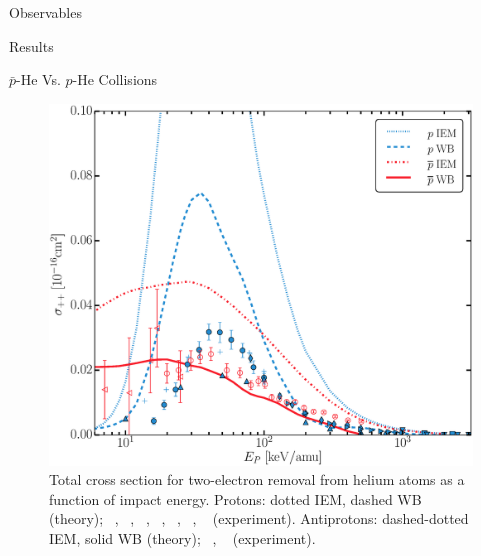 \documentclass[letterpaper, 11 pt]{report}
\begin{document}
\begin{chapter}{Observables \label{chap:p-he2p-he}}
\begin{section}{Results \label{sec:phe2p-res}}
\begin{subsection}{ \texorpdfstring{$\bar{p}$}{pbar}-He Vs. \texorpdfstring{$p$}{p}-He Collisions
                         \label{sec:pbarhe-res}}
\begin{figure}[ht]
\begin{minipage}{.49\linewidth}
               \centering
               \includegraphics[width = \linewidth]{./images/pbarhe/pbarhe-++.eps}
               \caption[Total cross section for two-electron removal from helium atoms as a function of
                        impact energy]
                       {Total cross section for two-electron removal from helium atoms as a function
                        of impact energy. Protons: dotted IEM, dashed WB (theory);
                        {\color{blue}{$\blacktriangle$}}~\cite{DTR84}, {\color{blue}{$+$}}~\cite{Sol62},
                        {\color{blue}{$\bullet$}}~\cite{SG89},
                        {\color{blue}{$\blacklozenge$}}~\cite{SG85},
                       {\color{blue}{$\blacktriangleright$}}~\cite{PM70},
                       {\color{blue}{$\blacktriangledown$}}~\cite{Wex64},
                       {\color{blue}{$\blacksquare$}}~\cite{KAH84} (experiment).
                       Antiprotons: dashed-dotted IEM, solid WB (theory);
                       {\color{red}{$\circ$}}~\cite{HKM94}, {\color{red}{$\triangleleft$}}~\cite{KKT09}
                       (experiment). \label{fig:he++}}
            \end{minipage}
         \end{figure}


\end{subsection}
\end{section}
\end{chapter}
\end{document}
